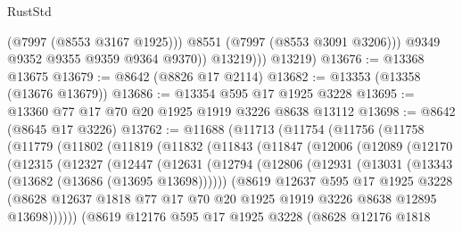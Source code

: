 \begin{lexlean}{RustStd}
\begin{coremodule}
{\begin{coremodule}
{{{{{{{{{{{{{{{{{{{{{{{{{{{{{{{{{{{{{{{{{{{                    (@7997 (@8553 @3167 @1925)))
                  @8551
                  (@7997 (@8553 @3091 @3206)))
                @9349
                @9352
                @9355
                @9359
                @9364
                @9370))
            @13219)))
      @13219)
@13676 := @13368 @13675
@13679 := @8642 (@8826 @17 @2114)
@13682 := @13353 (@13358 (@13676 @13679))
@13686 := @13354 @595 @17 @1925 @3228
@13695 := @13360 @77 @17 @70 @20 @1925 @1919 @3226 @8638 @13112
@13698 := @8642 (@8645 @17 @3226)
@13762 := @11688
    (@11713
      (@11754
        (@11756
          (@11758
            (@11779
              (@11802
                (@11819
                  (@11832
                    (@11843
                      (@11847
                        (@12006
                          (@12089
                            (@12170
                              (@12315
                                (@12327
                                  (@12447
                                    (@12631
                                      (@12794
                                        (@12806
                                          (@12931
                                            (@13031 (@13343 (@13682 (@13686 (@13695 @13698))))))
                                          (@8619
                                            @12637
                                            @595
                                            @17
                                            @1925
                                            @3228
                                            (@8628
                                              @12637
                                              @1818
                                              @77
                                              @17
                                              @70
                                              @20
                                              @1925
                                              @1919
                                              @3226
                                              @8638
                                              @12895
                                              @13698))))))
                                  (@8619
                                    @12176
                                    @595
                                    @17
                                    @1925
                                    @3228
                                    (@8628
                                      @12176
                                      @1818
}}}}}}}}}}}}}}}}}}}}}}}}}}}}}}}}}}}}}}}}}}}
\end{coremodule}}
\end{coremodule}
\end{lexlean}
